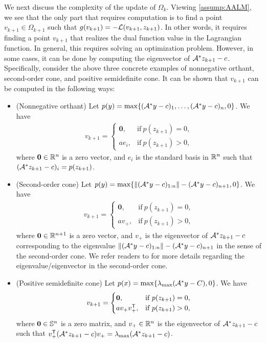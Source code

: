\documentclass[11pt]{article}
\begin{document}
We next discuss the complexity of the update of $\Omega_{k}$. Viewing \cref{assump:AALM}, we see that the only part that requires computation is to find a point $v_{k+1} \in \Omega_{k+1}$ such that $g(v_{k+1}) = - \mathcal{L}(v_{k+1},z_{k+1})$. In other words, it requires finding a point $v_{k+1}$ that realizes the dual function value in the Lagrangian function. In general, this requires solving an optimization problem. However, in some cases, it can be done by computing the eigenvector of $\mathcal{A}^* z_{k+1} -c$. Specifically, consider the above three concrete examples of nonnegative orthant, second-order cone, and positive semidefinite cone. It can be shown that $v_{k+1}$ can be computed in the following ways: 
\begin{itemize}[leftmargin=*]
    \item (Nonnegative orthant) Let $p(y) = \max\{(\mathcal{A}^* y -c)_1,\ldots,(\mathcal{A}^* y -c)_n ,0 \}$. We have
    \begin{align*}
        v_{k+1} = \begin{cases}
            \mathbf{0},  & \text{if}~  p(z_{k+1}) = 0,\\
            a e_i,       & \text{if}~p(z_{k+1}) > 0, 
        \end{cases}
    \end{align*}
    where $\mathbf{0} \in \mathbb{R}^n$ is a zero vector, and $e_i$ is the standard basis in $\mathbb{R}^n$ such that $(\mathcal{A}^* z_{k+1} -c)_i = p(z_{k+1})$.
    \item (Second-order cone) Let $p(y) = \max\{ \| (\mathcal{A}^* y -c)_{1:n} \| - (\mathcal{A}^* y -c)_{n+1},0\}$. We have 
    \begin{align*}
        v_{k+1} = \begin{cases}
            \mathbf{0},  & \text{if}~  p(z_{k+1}) = 0,\\
            a v_+,       & \text{if}~p(z_{k+1}) > 0, 
        \end{cases}
    \end{align*}
    where $\mathbf{0} \in \mathbb{R}^{n+1}$ is a zero vector, and $v_+$ is the eigenvector of $\mathcal{A}^* z_{k+1} - c$ corresponding to the eigenvalue $ \| (\mathcal{A}^* y -c)_{1:n} \| - (\mathcal{A}^* y -c)_{n+1}$ in the sense of the second-order cone. We refer readers to \cite{alizadeh2003second} for more details regarding the eigenvalue/eigenvector in the second-order cone.
    \item (Positive semidefinite cone) Let $p(x) =\max\{\lambda_{\max}(\mathcal{A}^* y - C),0\}$. We have 
    \begin{align*}
        v_{k+1} = \begin{cases}
            \mathbf{0},  & \text{if}~  p(z_{k+1}) = 0,\\
            a v_+ v_+^{\mathsf{ T}},       & \text{if}~p(z_{k+1}) > 0, 
        \end{cases}
    \end{align*}
    where $\mathbf{0} \in \mathbb{S}^n$ is a zero matrix, and $v_+ \in \mathbb{R}^n$ is the eigenvector of $\mathcal{A}^* z_{k+1} - c$ such that $v_+^{\mathsf{ T}} (\mathcal{A}^* z_{k+1} - c) v_+ = \lambda_{\max}(\mathcal{A}^* z_{k+1} - c)$.
\end{itemize}
\end{document}
